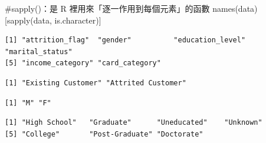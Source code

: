 \documentclass[
  letterpaper,
  DIV=11,
  numbers=noendperiod]{scrartcl}
\newenvironment{Shaded}{\begin{snugshade}}{\end{snugshade}}
\newcommand{\CommentTok}[1]{\textcolor[rgb]{0.37,0.37,0.37}{#1}}
\newcommand{\FunctionTok}[1]{\textcolor[rgb]{0.28,0.35,0.67}{#1}}
\newcommand{\NormalTok}[1]{\textcolor[rgb]{0.00,0.23,0.31}{#1}}
\newcommand{\SpecialCharTok}[1]{\textcolor[rgb]{0.37,0.37,0.37}{#1}}
\begin{document}
\begin{Shaded}
\begin{Highlighting}[]
\CommentTok{\#sapply()：是 R 裡用來「逐一作用到每個元素」的函數}
\FunctionTok{names}\NormalTok{(data)[}\FunctionTok{sapply}\NormalTok{(data, is.character)]}
\end{Highlighting}
\end{Shaded}

\begin{verbatim}
[1] "attrition_flag"  "gender"          "education_level" "marital_status" 
[5] "income_category" "card_category"  
\end{verbatim}

\begin{Shaded}
\end{Shaded}

\begin{verbatim}
[1] "Existing Customer" "Attrited Customer"
\end{verbatim}

\begin{Shaded}
\end{Shaded}

\begin{verbatim}
[1] "M" "F"
\end{verbatim}

\begin{Shaded}
\end{Shaded}

\begin{verbatim}
[1] "High School"   "Graduate"      "Uneducated"    "Unknown"      
[5] "College"       "Post-Graduate" "Doctorate"    
\end{verbatim}

\begin{Shaded}
\end{Shaded}
\end{document}

